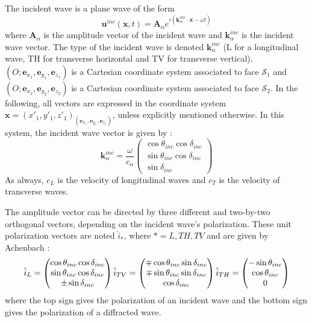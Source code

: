 The incident wave is a plane wave of the form
\begin{equation}
\mathbf{u}^{inc}(\mathbf{x},t)=\mathbf{A}_{\alpha}e^{i(\mathbf{k}_{\alpha}^{inc}\cdot \mathbf{x}-\omega t)}
\end{equation}
where $\mathbf{A}_{\alpha}$ is the amplitude vector of the incident wave and $\mathbf{k}_{\alpha}^{inc}$ is the incident wave vector. The type of the incident wave is denoted $\mathbf{k}_{\alpha}^{inc}$ (L for a longitudinal wave, TH for transverse horizontal and TV for transverse vertical). $(O; \mathbf{e}_{x_1}, \mathbf{e}_{y_1}, \mathbf{e}_{z_1})$ is a Cartesian coordinate system associated to face $\mathcal{S}_1$ and $(O; \mathbf{e}_{x_2}, \mathbf{e}_{y_2}, \mathbf{e}_{z_2})$ is a Cartesian coordinate system associated to face $\mathcal{S}_2$. In the following, all vectors are expressed in the coordinate system $\mathbf{x}=(x'_1,y'_1,z'_1)_{(\mathbf{e}_{x_1}, \mathbf{e}_{y_1}, \mathbf{e}_{z_1})}$, unless explicitly mentioned otherwise. In this system, the incident wave vector is given by :
\begin{equation}
\mathbf{k}_{\alpha}^{inc}=\frac{\omega}{c_{\alpha}} \begin{pmatrix}
\cos\theta_{inc} \cos \delta_{inc} \\ \sin\theta_{inc} \cos \delta_{inc} \\
\sin \delta_{inc}
\end{pmatrix}
\end{equation}
As always, $c_L$ is the velocity of longitudinal waves and $c_T$ is the velocity of transverse waves.

The amplitude vector can be directed by three different and two-by-two orthogonal vectors, depending on the incident wave's polarization. These unit polarization vectors are noted $\hat{i}_*$, where $*=L, TH, TV$ and are given by Achenbach \cite{Achenbach} :
\begin{equation}
\hat{i}_L = \begin{pmatrix}
\cos\theta_{inc} \cos \delta_{inc} \\ \sin\theta_{inc} \cos \delta_{inc} \\
\pm \sin \delta_{inc}
\end{pmatrix}
\hfill
\hfill
\hat{i}_{TV} = \begin{pmatrix}
\mp\cos\theta_{inc} \sin \delta_{inc} \\ \mp\sin\theta_{inc} \sin \delta_{inc} \\
\cos \delta_{inc}
\end{pmatrix}
\hfill
\hfill
\hat{i}_{TH} = \begin{pmatrix}
-\sin\theta_{inc} \\ \cos\theta_{inc} \\
0
\end{pmatrix}
\label{C4:ivec}
\end{equation}
where the top sign gives the polarization of an incident wave and the bottom sign gives the polarization of a diffracted wave.

